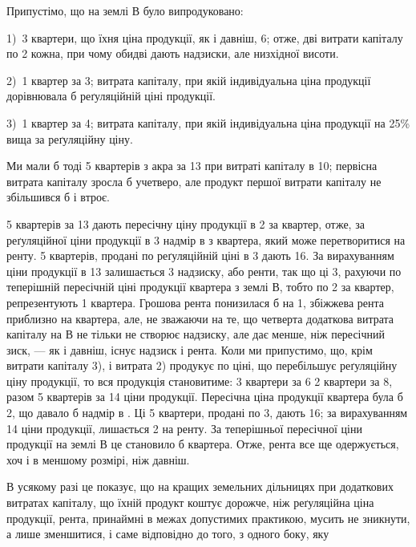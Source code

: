 Припустімо, що на землі $В$ було випродуковано:

1)~3 квартери, що їхня ціна продукції, як і давніш, 6; отже,
дві витрати капіталу по  2 кожна, при чому обидві дають надзиски,
але низхідної висоти.

2)~1 квартер за 3; витрата капіталу, при якій індивідуальна
ціна продукції дорівнювала б реґуляційній ціні продукції.

3)~1 квартер за 4; витрата капіталу, при якій індивідуальна
ціна продукції на 25\% вища за реґуляційну ціну.

Ми мали б тоді 5 квартерів з акра за 13 при витраті капіталу
в 10; первісна витрата капіталу зросла б учетверо, але продукт
першої витрати капіталу не збільшився б і втроє.

5 квартерів за 13 дають пересічну ціну продукції в 2
за квартер, отже, за реґуляційної ціни продукції в 3 надмір
в  з квартера, який може перетворитися на ренту.
5 квартерів, продані по реґуляційній ціні в 3 дають
16. За вирахуванням
ціни продукції в 13 залишається 3 надзиску, або
ренти, так що ці 3, рахуючи по теперішній пересічній ціні
продукції квартера з землі $В$, тобто по 2 за квартер,
репрезентують 1
квартера. Грошова рента понизилася б на 1, збіжжева
рента приблизно на  квартера, але, не зважаючи на те, що четверта додаткова
витрата капіталу на $В$ не тільки не створює надзиску, але дає менше, ніж
пересічний зиск, — як і давніш, існує надзиск і рента. Коли ми припустимо, що,
крім витрати капіталу 3), і витрата 2) продукує по ціні, що перебільшує реґуляційну
ціну продукції, то вся продукція становитиме: 3 квартери за
6 \dplus{} 2 квартери за 8, разом 5 квартерів за 14
ціни продукції. Пересічна ціна продукції квартера була б 2,
що давало б надмір в . Ці 5  квартери, продані по
3, дають 16; за вирахуванням
14 ціни продукції, лишається 2 на ренту. За теперішньої
пересічної ціни продукції на землі $В$ це становило б  квартера.
Отже, рента все ще одержується, хоч і в меншому розмірі, ніж давніш.

В усякому разі це показує, що на кращих земельних дільницях при додаткових
витратах капіталу, що їхній продукт коштує дорожче, ніж реґуляційна
ціна продукції, рента, принаймні в межах допустимих практикою, мусить не
зникнути, а лише зменшитися, і саме відповідно до того, з одного боку, яку
\parbreak{}  %
